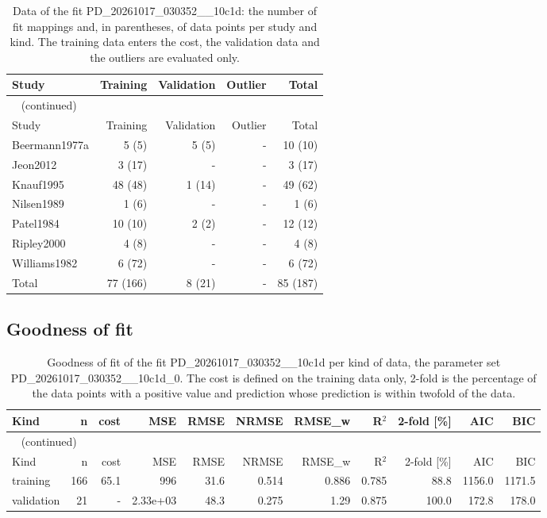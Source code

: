 \begin{longtable}{lrrrr}
\caption{Data of the fit PD\_20261017\_030352\_\_10c1d: the number of fit mappings and, in parentheses, of data points per study and kind. The training data enters the cost, the validation data and the outliers are evaluated only.}\label{tab:data:PD_20261017_030352__10c1d} \\
\toprule
Study & Training & Validation & Outlier & Total \\
\midrule
\endfirsthead
\multicolumn{5}{l}{\small\tablename~\thetable{} (continued)} \\
\toprule
Study & Training & Validation & Outlier & Total \\
\midrule
\endhead
\bottomrule
\endlastfoot
Beermann1977a & 5 (5) & 5 (5) & - & 10 (10) \\
Jeon2012 & 3 (17) & - & - & 3 (17) \\
Knauf1995 & 48 (48) & 1 (14) & - & 49 (62) \\
Nilsen1989 & 1 (6) & - & - & 1 (6) \\
Patel1984 & 10 (10) & 2 (2) & - & 12 (12) \\
Ripley2000 & 4 (8) & - & - & 4 (8) \\
Williams1982 & 6 (72) & - & - & 6 (72) \\
Total & 77 (166) & 8 (21) & - & 85 (187) \\
\end{longtable}

\subsection{Goodness of fit}

\begin{longtable}{lrrrrrrrrrr}
\caption{Goodness of fit of the fit PD\_20261017\_030352\_\_10c1d per kind of data, the parameter set PD\_20261017\_030352\_\_10c1d\_0. The cost is defined on the training data only, 2-fold is the percentage of the data points with a positive value and prediction whose prediction is within twofold of the data.}\label{tab:metrics:PD_20261017_030352__10c1d} \\
\toprule
Kind & n & cost & MSE & RMSE & NRMSE & RMSE\_w & R\ensuremath{^{2}} & 2-fold [\%] & AIC & BIC \\
\midrule
\endfirsthead
\multicolumn{11}{l}{\small\tablename~\thetable{} (continued)} \\
\toprule
Kind & n & cost & MSE & RMSE & NRMSE & RMSE\_w & R\ensuremath{^{2}} & 2-fold [\%] & AIC & BIC \\
\midrule
\endhead
\bottomrule
\endlastfoot
training & 166 & 65.1 & 996 & 31.6 & 0.514 & 0.886 & 0.785 & 88.8 & 1156.0 & 1171.5 \\
validation & 21 & - & 2.33e+03 & 48.3 & 0.275 & 1.29 & 0.875 & 100.0 & 172.8 & 178.0 \\
\end{longtable}

